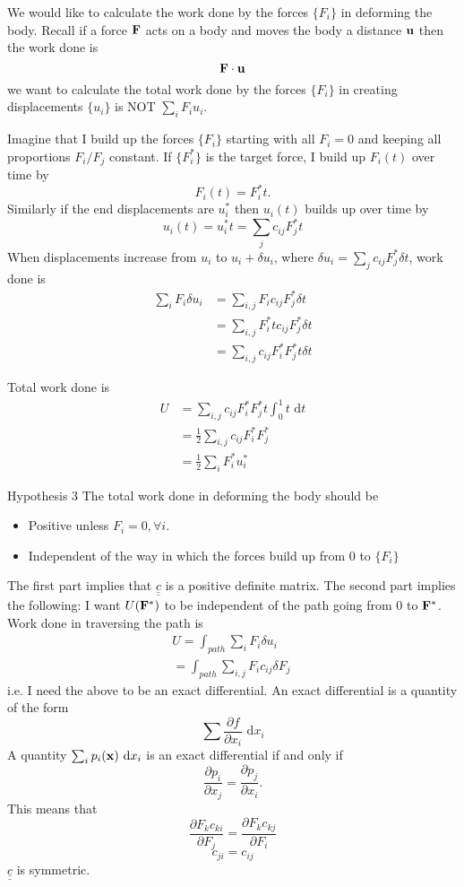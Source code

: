 \documentclass[12pt]{article}
\newcommand{\xx}{{\bf x}}
\newcommand{\uu}{{\bf u}}
\newcommand{\FF}{{\bf F}}
\newcommand{\cc}{{\underline{\underline c}}}
\newcommand{\dx}[1]{\text{ d}#1}
\begin{document}
We would like to calculate the work done by the forces $\{F_i\}$ in deforming the body. Recall if a force $\FF$ acts on a body and moves the body a distance $\uu$ then the work done is 
\[
\FF\cdot\uu
\]
we want to calculate the total work done by the forces $\{F_i\}$ in creating displacements $\{u_i\}$ is NOT $\sum_i F_i u_i$.

Imagine that I build up the forces $\{F_i\}$ starting with all $F_i=0$ and keeping all proportions $F_i/F_j$ constant.
If $\{F_i^*\}$ is the target force, I build up $F_i(t)$ over time by 
\[
F_i(t) = F_i^*t.
\]
Similarly if the end displacements are $u_i^*$ then $u_i(t)$ builds up over time by 
\[
u_i(t) = u_i^*t = \sum_j c_{ij} F_j^*t
\]
When displacements increase from $u_i$ to $u_i+\delta u_i$, where $\delta u_i= \sum_j c_{ij} F_j^*\delta t$, work done is 
\begin{align*}
\sum_i F_i \delta u_i &= \sum_{i,j} F_ic_{ij}F_j^*\delta t\\
	&= \sum_{i,j} F_i^*tc_{ij}F_j^*\delta t\\
	&= \sum_{i,j} c_{ij}F_i^*F_j^*t\delta t
\end{align*}

Total work done is 
\begin{align*}
U &= \sum_{i,j} c_{ij}F_i^*F_j^*t\int_0^1 t \dx{t}\\
	&=\frac 1 2 \sum_{i,j} c_{ij}F_i^*F_j^*\\
	&=\frac 1 2 \sum_i F_i^* u_i^*
\end{align*}

Hypothesis 3
The total work done in deforming the body should be 
\begin{itemize}
\item Positive unless $F_i=0, \forall i$.
\item Independent of the way in which the forces build up from 0 to $\{F_i\}$
\end{itemize}

The first part implies that $\cc$ is a positive definite matrix.
The second part implies the following:
I want $U(\FF^*)$ to be independent of the path going from 0 to $\FF^*$. Work done in traversing the path is
\begin{align*}
U = \int_{path} \sum_iF_i\delta u_i\\
	=  \int_{path} \sum_{i,j} F_i c_{ij}\delta F_j\
\end{align*} 
i.e. I need the above to be an exact differential. An exact differential is a quantity of the form 
\[
\sum\frac{\partial f}{\partial x_i} \dx{x_i}
\]
A quantity $\sum_i p_i(\xx) \dx{x_i}$ is an exact differential if and only if 
\[
\frac{\partial p_i}{\partial x_j} = \frac{\partial p_j}{\partial x_i}.
\]
This means that 
\[
\frac{\partial F_kc_{ki}}{\partial F_j} = \frac{\partial F_kc_{kj}}{\partial F_i} 
\]
\[c_{ji} = c_{ij}\]
$\cc$ is symmetric.
\end{document}
